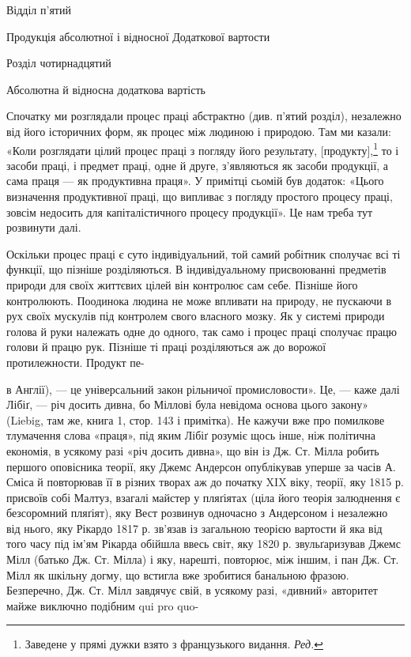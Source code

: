Відділ п'ятий

Продукція абсолютної і відносної
Додаткової вартости

Розділ чотирнадцятий

Абсолютна й відносна додаткова вартість

Спочатку ми розглядали процес праці абстрактно (див. п’ятий
розділ), незалежно від його історичних форм, як процес між
людиною і природою. Там ми казали: «Коли розглядати цілий
процес праці з погляду його результату, [продукту],\footnote*{
Заведене у прямі дужки взято з французького видання. \emph{Ред.}
} то і засоби
праці, і предмет праці, одне й друге, з’являються як засоби
продукції, а сама праця — як продуктивна праця». У примітці
сьомій був додаток: «Цього визначення продуктивної праці,
що випливає з погляду простого процесу праці, зовсім недосить
для капіталістичного процесу продукції». Це нам треба тут
розвинути далі.

Оскільки процес праці є суто індивідуальний, той самий
робітник сполучає всі ті функції, що пізніше розділяються. В індивідуальному
присвоюванні предметів природи для своїх життєвих
цілей він контролює сам себе. Пізніше його контролюють.
Поодинока людина не може впливати на природу, не пускаючи
в рух своїх мускулів під контролем свого власного мозку. Як у
системі природи голова й руки належать одне до одного, так само
і процес праці сполучає працю голови й працю рук. Пізніше ті
праці розділяються аж до ворожої протилежности. Продукт пе-

в Англії), — це універсальний закон рільничої промисловости». Це, — каже
далі Лібіґ, — річ досить дивна, бо Міллові була невідома основа цього закону»
(Liebig, там же, книга 1, стор. 143 і примітка). Не кажучи вже про
помилкове тлумачення слова «праця», під яким Лібіґ розуміє щось інше,
ніж політична економія, в усякому разі «річ досить дивна», що він із Дж.
Ст. Мілла робить першого оповісника теорії, яку Джемс Андерсон опублікував
уперше за часів А. Сміса й повторював її в різних творах аж до
початку XIX віку, теорії, яку 1815 р. присвоїв собі Малтуз, взагалі
майстер у пляґіятах (ціла його теорія залюднення є безсоромний пляґіят),
яку Вест розвинув одночасно з Андерсоном і незалежно від нього,
яку Рікардо 1817 р. зв’язав із загальною теорією вартости й яка від
того часу під ім’ям Рікарда обійшла ввесь світ, яку 1820 р. звульґаризував
Джемс Мілл (батько Дж. Ст. Мілла) і яку, нарешті, повторює, між
іншим, і пан Дж. Ст. Мілл як шкільну догму, що встигла вже зробитися
банальною фразою. Безперечно, Дж. Ст. Мілл завдячує свій, в усякому
разі, «дивний» авторитет майже виключно подібним qui pro quo-